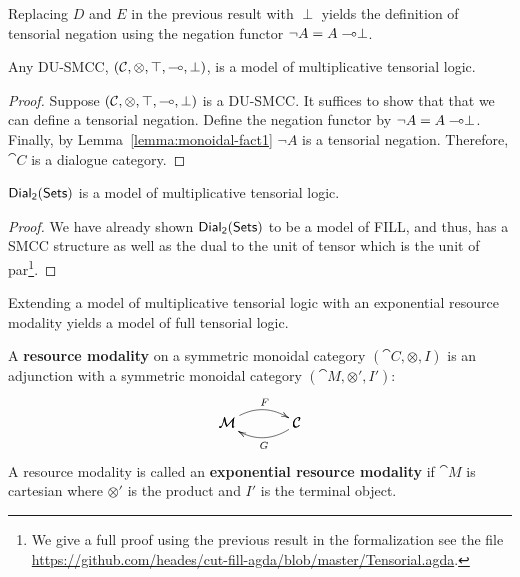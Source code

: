 Replacing $D$ and $E$ in the previous result with $\perp$ yields the
definition of tensorial negation using the negation functor $\lnot A =
A \multimap \perp$.
\begin{lemma}
  \label{lemma:dial-tensorial-model}
  Any DU-SMCC, $(\mathcal{C}, \otimes, \top, \multimap, \perp)$, is a model of
  multiplicative tensorial logic.
\end{lemma}
\begin{proof}  
  Suppose $(\mathcal{C}, \otimes, \top, \multimap, \perp)$ is a DU-SMCC.  It
  suffices to show that that we can define a tensorial negation.
  Define the negation functor by $\lnot A = A \multimap \perp$.  Finally,
  by Lemma~\ref{lemma:monoidal-fact1} $\lnot A$ is a tensorial
  negation.  Therefore, $\cat{C}$ is a dialogue category.
\end{proof}
\begin{corollary}
  \label{corollary:dial-tensorial}
  $\mathsf{Dial_2}(\mathsf{Sets})$ is a model of multiplicative tensorial logic.
\end{corollary}
\begin{proof}
  We have already shown $\mathsf{Dial_2}(\mathsf{Sets})$ to be a model of FILL, and thus, has a
  SMCC structure as well as the dual to the unit of tensor which is
  the unit of par\footnote{We give a full proof using the previous
    result in the formalization see the file
    \url{https://github.com/heades/cut-fill-agda/blob/master/Tensorial.agda}.}.
\end{proof}
Extending a model of multiplicative tensorial logic with an exponential
resource modality yields a model of full tensorial logic.
\begin{definition}
  \label{def:resource-modality}
  A \textbf{resource modality} on a symmetric monoidal category
  $(\cat{C}, \otimes, I)$ is an adjunction with a symmetric monoidal
  category $(\cat{M}, \otimes', I')$:
  \[
  \bfig
  \morphism(0,0)|a|/{@{>}@/^1em/}/<500,0>[\cat{M}`\cat{C};F]
  \morphism(0,0)|b|/{@{<-}@/_1em/}/<500,0>[\cat{M}`\cat{C};G]
  \efig
  \]
  A resource modality is called an \textbf{exponential resource
    modality} if $\cat{M}$ is cartesian where $\otimes'$ is the
  product and $I'$ is the terminal object.
\end{definition}

